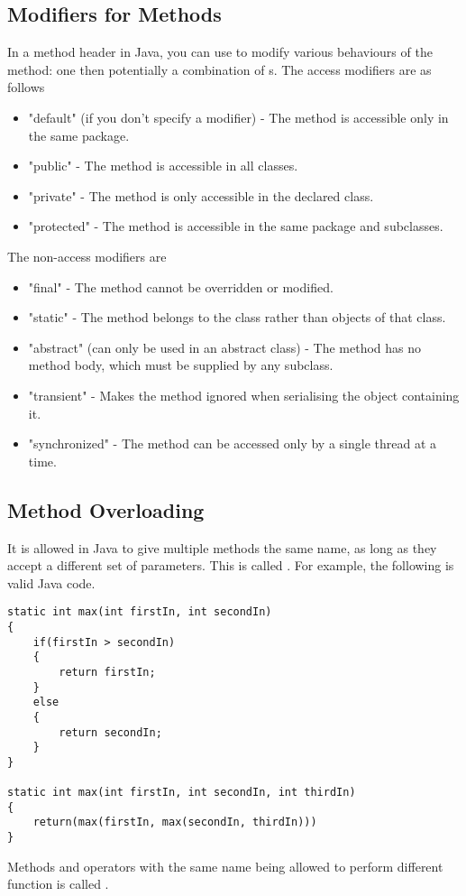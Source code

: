 \documentclass[11pt]{article}
\begin{document}
\subsection{Modifiers for Methods}
In a method header in Java, you can use  to modify various behaviours of the method: one  then potentially a combination of s. The access modifiers are as follows
\begin{itemize}
    \item \inlineJava"default" (if you don't specify a modifier) - The method is accessible only in the same package.
    \item \inlineJava"public" - The method is accessible in all classes.
    \item \inlineJava"private" - The method is only accessible in the declared class.
    \item \inlineJava"protected" - The method is accessible in the same package and subclasses.
\end{itemize}
The non-access modifiers are
\begin{itemize}
    \item \inlineJava"final" - The method cannot be overridden or modified.
    \item \inlineJava"static" - The method belongs to the class rather than objects of that class.
    \item \inlineJava"abstract" (can only be used in an abstract class) - The method has no method body, which must be supplied by any subclass.
    \item \inlineJava"transient" - Makes the method ignored when serialising the object containing it.
    \item \inlineJava"synchronized" - The method can be accessed only by a single thread at a time.
\end{itemize}
\pagebreak
\subsection{Method Overloading}
It is allowed in Java to give multiple methods the same name, as long as they accept a different set of parameters. This is called . For example, the following is valid Java code.
\begin{lstlisting}
static int max(int firstIn, int secondIn)
{
    if(firstIn > secondIn)
    {
        return firstIn;
    }
    else
    {
        return secondIn;
    }
}

static int max(int firstIn, int secondIn, int thirdIn)
{
    return(max(firstIn, max(secondIn, thirdIn)))
}
\end{lstlisting}
\begin{defi}[Polymorphism]
    Methods and operators with the same name being allowed to perform different function is called .
\end{defi}
\pagebreak
\end{document}
